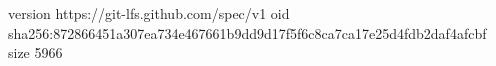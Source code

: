 version https://git-lfs.github.com/spec/v1
oid sha256:872866451a307ea734e467661b9dd9d17f5f6c8ca7ca17e25d4fdb2daf4afcbf
size 5966
